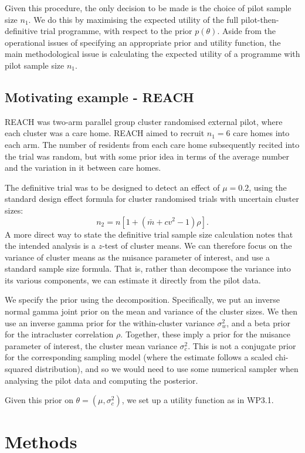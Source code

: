 \documentclass[sagev, Crown]{sagej} %
\begin{document}
Given this procedure, the only decision to be made is the choice of pilot sample size $n_1$. We do this by maximising the expected utility of the full pilot-then-definitive trial programme, with respect to the prior $p(\theta)$. Aside from the operational issues of specifying an appropriate prior and utility function, the main methodological issue is calculating the expected utility of a programme with pilot sample size $n_1$. 

\subsection{Motivating example - REACH}

REACH was two-arm parallel group cluster randomised external pilot, where each cluster was a care home. REACH aimed to recruit $n_1 = 6$ care homes into each arm. The number of residents from each care home subsequently recited into the trial was random, but with some prior idea in terms of the average number and the variation in it between care homes. 

The definitive trial was to be designed to detect an effect of $\mu = 0.2$, using the standard design effect formula for cluster randomised trials with uncertain cluster sizes:
$$
n_2 = n [1 + (\bar{m} + cv^2 - 1)\rho].
$$
A more direct way to state the definitive trial sample size calculation notes that the intended analysis is a $z$-test of cluster means. We can therefore focus on the variance of cluster means as the nuisance parameter of interest, and use a standard sample size formula. That is, rather than decompose the variance into its various components, we can estimate it directly from the pilot data.

We specify the prior using the decomposition. Specifically, we put an inverse normal gamma joint prior on the mean and variance of the cluster sizes. We then use an inverse gamma prior for the within-cluster variance $\sigma_w^2$, and a beta prior for the intracluster correlation $\rho$. Together, these imply a prior for the nuisance parameter of interest, the cluster mean variance $\sigma^2_c$. This is not a conjugate prior for the corresponding sampling model (where the estimate follows a scaled chi-squared distribution), and so we would need to use some numerical sampler when analysing the pilot data and computing the posterior.

Given this prior on $\theta = (\mu, \sigma_c^2)$, we set up a utility function as in WP3.1.

\section{Methods}
\end{document}
